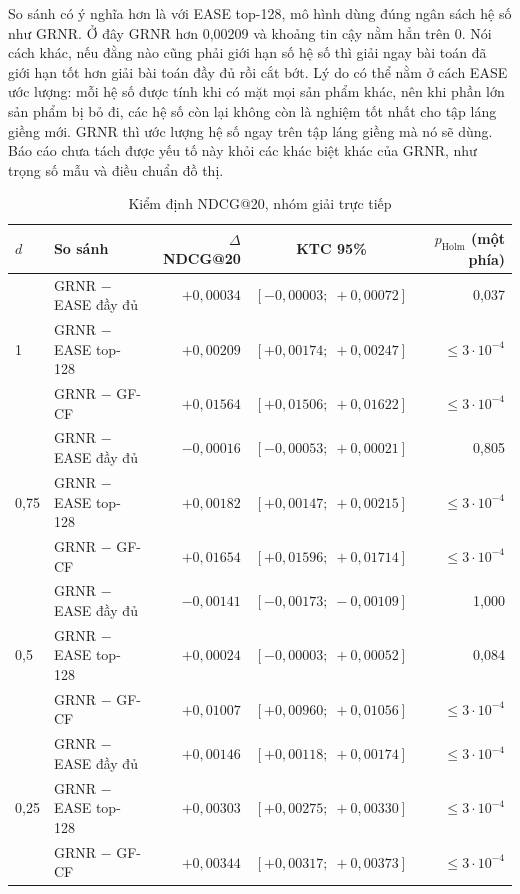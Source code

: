 So sánh có ý nghĩa hơn là với EASE top-128, mô hình dùng đúng ngân sách hệ số như GRNR. Ở đây GRNR hơn 0,00209 và khoảng tin cậy nằm hẳn trên 0. Nói cách khác, nếu đằng nào cũng phải giới hạn số hệ số thì giải ngay bài toán đã giới hạn tốt hơn giải bài toán đầy đủ rồi cắt bớt. Lý do có thể nằm ở cách EASE ước lượng: mỗi hệ số được tính khi có mặt mọi sản phẩm khác, nên khi phần lớn sản phẩm bị bỏ đi, các hệ số còn lại không còn là nghiệm tốt nhất cho tập láng giềng mới. GRNR thì ước lượng hệ số ngay trên tập láng giềng mà nó sẽ dùng. Báo cáo chưa tách được yếu tố này khỏi các khác biệt khác của GRNR, như trọng số mẫu và điều chuẩn đồ thị.

\begin{table}[H]
\centering
\small
\begin{tabular}{@{}llrcr@{}}
\toprule
$d$ & So sánh & $\Delta$ NDCG@20 & KTC 95\% & $p_{\mathrm{Holm}}$ (một phía) \\
\midrule
\multirow{3}{*}{1} & GRNR $-$ EASE đầy đủ & $+0{,}00034$ & $[-0{,}00003;\;+0{,}00072]$ & 0,037 \\
 & GRNR $-$ EASE top-128 & $+0{,}00209$ & $[+0{,}00174;\;+0{,}00247]$ & $\le 3\cdot10^{-4}$ \\
 & GRNR $-$ GF-CF & $+0{,}01564$ & $[+0{,}01506;\;+0{,}01622]$ & $\le 3\cdot10^{-4}$ \\
\midrule
\multirow{3}{*}{0,75} & GRNR $-$ EASE đầy đủ & $-0{,}00016$ & $[-0{,}00053;\;+0{,}00021]$ & 0,805 \\
 & GRNR $-$ EASE top-128 & $+0{,}00182$ & $[+0{,}00147;\;+0{,}00215]$ & $\le 3\cdot10^{-4}$ \\
 & GRNR $-$ GF-CF & $+0{,}01654$ & $[+0{,}01596;\;+0{,}01714]$ & $\le 3\cdot10^{-4}$ \\
\midrule
\multirow{3}{*}{0,5} & GRNR $-$ EASE đầy đủ & $-0{,}00141$ & $[-0{,}00173;\;-0{,}00109]$ & 1,000 \\
 & GRNR $-$ EASE top-128 & $+0{,}00024$ & $[-0{,}00003;\;+0{,}00052]$ & 0,084 \\
 & GRNR $-$ GF-CF & $+0{,}01007$ & $[+0{,}00960;\;+0{,}01056]$ & $\le 3\cdot10^{-4}$ \\
\midrule
\multirow{3}{*}{0,25} & GRNR $-$ EASE đầy đủ & $+0{,}00146$ & $[+0{,}00118;\;+0{,}00174]$ & $\le 3\cdot10^{-4}$ \\
 & GRNR $-$ EASE top-128 & $+0{,}00303$ & $[+0{,}00275;\;+0{,}00330]$ & $\le 3\cdot10^{-4}$ \\
 & GRNR $-$ GF-CF & $+0{,}00344$ & $[+0{,}00317;\;+0{,}00373]$ & $\le 3\cdot10^{-4}$ \\
\bottomrule
\end{tabular}
\caption{Kiểm định NDCG@20, nhóm giải trực tiếp}
\label{tab:closed-form-sig}
\end{table}


